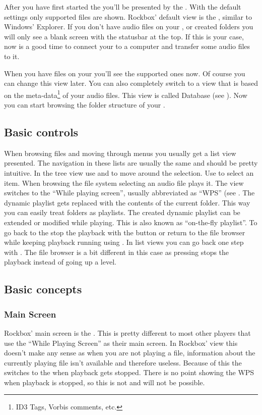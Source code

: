 After you have  first started the \dap{} you'll be presented by the
. With the default settings only supported files are
shown. Rockbox' default view is the , similar to Windows'
Explorer. If you don't have audio files on your \dap{}, or created folders you
will only see a blank screen with the statusbar at the top. If this is your
case, now is a good time to connect your \dap{} to a computer and transfer some
audio files to it.

When you have files on your \dap{} you'll see the supported ones now. Of
course you can change this view later. You can also completely switch to
a view that is based on the meta-data\footnote{ID3 Tags, Vorbis comments, etc.}
of your audio files. This view is called Database (see
). Now you can start browsing the folder structure of
your \dap{}.

\subsection{Basic controls}
When browsing files and moving through menus you usually get a list view
presented. The navigation in these lists are usually the same and should be
pretty intuitive.
In the tree view use \ActionStdNext{} and \ActionStdPrev{} to move around
the selection. Use \ActionStdOk{} to select an item. When browsing the file
system selecting an audio file plays it. The view switches to the ``While
playing screen'', usually abbreviated as ``WPS'' (see . The
dynamic playlist gets replaced with the contents of the current folder. This
way you can easily treat folders as playlists. The created dynamic playlist can
be extended or modified while playing. This is also known as
``on-the-fly playlist''.
To go back to the  stop the playback with the
\ActionWpsStop{} button or return to the file browser while keeping playback
running using \ActionWpsBrowse{}.
In list views you can go back one step with \ActionStdCancel{}. The file
browser is a bit different in this case as pressing \ActionWpsStop{}
stops the playback instead of going up a level.

\subsection{Basic concepts}
\subsubsection{Main Screen}
Rockbox' main screen is the . This is pretty different to
most other players that use the ``While Playing Screen'' as their main screen.
In Rockbox' view this doesn't make any sense as when you are not playing a
file, information about the currently playing file isn't available and therefore
useless. Because of this the \dap{} switches to the  when
playback gets stopped. There is no point showing the WPS when playback is
stopped, so this is not and will not be possible.

